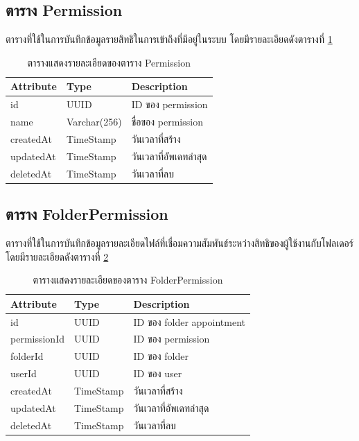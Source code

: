\documentclass[12pt,oneside,openright,a4paper]{cpe-thai-project}
\begin{document}
\subsection{ตาราง Permission}
ตารางที่ใช้ในการบันทึกข้อมูลรายสิทธิในการเข้าถึงที่มีอยู่ในระบบ โดยมีรายละเอียดดังตารางที่ \ref{tbl:dbPermission}
\begin{table}[!ht]
    \centering
    \begin{tabular}{|p{4cm}|p{2cm}|p{6cm}|}
    \hline
    \textbf{Attribute} & \textbf{Type} & \textbf{Description}   \\ \hline
    id        & UUID        & ID ของ permission      \\ \hline
    name      & Varchar(256) & ชื่อของ permission     \\ \hline
    createdAt & TimeStamp   & วันเวลาที่สร้าง        \\ \hline
    updatedAt & TimeStamp   & วันเวลาที่อัพเดทล่าสุด \\ \hline
    deletedAt & TimeStamp   & วันเวลาที่ลบ                \\ \hline
    \end{tabular}
    \caption{\centering  ตารางแสดงรายละเอียดของตาราง Permission} \label{tbl:dbPermission}
\end{table}

\subsection{ตาราง FolderPermission}
ตารางที่ใช้ในการบันทึกข้อมูลรายละเอียดไฟล์ที่เชื่อมความสัมพันธ์ระหว่างสิทธิของผู้ใช้งานกับโฟลเดอร์ โดยมีรายละเอียดดังตารางที่ \ref{tbl:dbFolderPermission}
\begin{table}[!ht]
    \centering
    \begin{tabular}{|p{4cm}|p{2cm}|p{6cm}|}
    \hline
    \textbf{Attribute} & \textbf{Type} & \textbf{Description}   \\ \hline
    id           & UUID      & ID ของ folder appointment \\ \hline
    permissionId & UUID      & ID ของ permission         \\ \hline
    folderId     & UUID      & ID ของ folder             \\ \hline
    userId       & UUID      & ID ของ user               \\ \hline
    createdAt    & TimeStamp & วันเวลาที่สร้าง           \\ \hline
    updatedAt    & TimeStamp & วันเวลาที่อัพเดทล่าสุด    \\ \hline
    deletedAt    & TimeStamp & วันเวลาที่ลบ            \\ \hline
    \end{tabular}
    \caption{\centering  ตารางแสดงรายละเอียดของตาราง FolderPermission} \label{tbl:dbFolderPermission}
\end{table}
\end{document}
